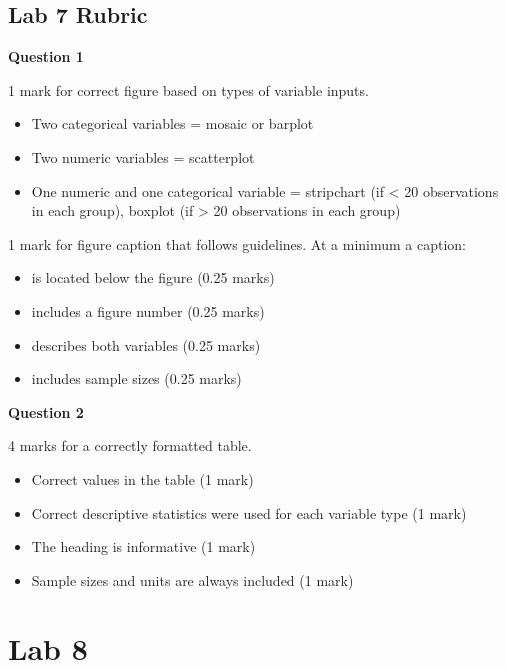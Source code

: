 \documentclass[
]{book}
\providecommand{\tightlist}{%
  \setlength{\itemsep}{0pt}\setlength{\parskip}{0pt}}
\begin{document}
\hypertarget{lab-7-rubric}{%
\chapter*{Lab 7 Rubric}\label{lab-7-rubric}}

\textbf{Question 1}

1 mark for correct figure based on types of variable inputs.

\begin{itemize}
\tightlist
\item
  Two categorical variables = mosaic or barplot
\item
  Two numeric variables = scatterplot
\item
  One numeric and one categorical variable = stripchart (if \textless{} 20 observations in each group), boxplot (if \textgreater{} 20 observations in each group)
\end{itemize}

1 mark for figure caption that follows guidelines. At a minimum a caption:

\begin{itemize}
\tightlist
\item
  is located below the figure (0.25 marks)
\item
  includes a figure number (0.25 marks)
\item
  describes both variables (0.25 marks)
\item
  includes sample sizes (0.25 marks)
\end{itemize}

\textbf{Question 2}

4 marks for a correctly formatted table.

\begin{itemize}
\tightlist
\item
  Correct values in the table (1 mark)
\item
  Correct descriptive statistics were used for each variable type (1 mark)
\item
  The heading is informative (1 mark)
\item
  Sample sizes and units are always included (1 mark)
\end{itemize}

\hypertarget{part-lab-8}{%
\part*{Lab 8}\label{part-lab-8}}
\end{document}
